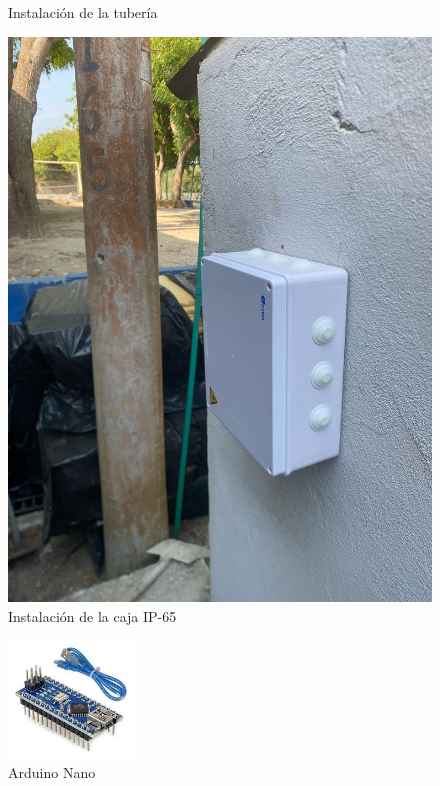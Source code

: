 \documentclass[12pt]{article}
\begin{document}
\begin{figure}[h!]
\begin{minipage}[b]{0.48\textwidth}
            \caption{Instalación de la tubería}
            \label{fig:sprinkler2}
      \end{minipage}
      \hfill
      \begin{minipage}[b]{0.48\textwidth}
            \includegraphics[width=\textwidth]{imagenes/box.jpg}
            \caption{Instalación de la caja IP-65}
            \label{fig:box}
      \end{minipage}
\end{figure}


\begin{figure}[h!]
      \centering
      \includegraphics[width=0.3\textwidth]{imagenes/arduino.jpg}
      \caption{Arduino Nano}
      \label{fig:arduino}
\end{figure}
\end{document}
